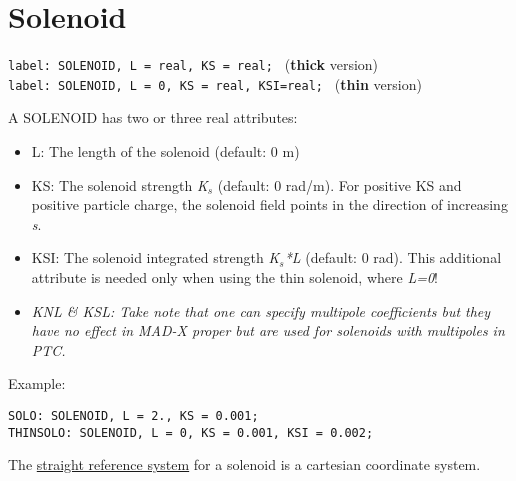 
\section{Solenoid}

\texttt{label: SOLENOID, L = real, KS = real;           } (\textbf{thick} version) 
\\
\texttt{label: SOLENOID, L = 0,    KS = real, KSI=real; } (\textbf{thin} version) 

A SOLENOID has two or three real attributes: 
\begin{itemize}
   \item L: The length of the solenoid (default: 0 m) 
   \item KS: The solenoid strength \textit{K$_s$} (default: 0
     rad/m). For positive KS and positive particle charge, the solenoid
     field points in the direction of increasing \textit{s}.  
   \item KSI: The solenoid integrated strength \textit{K$_s$*L}
     (default: 0 rad).  This additional attribute is needed only when
     using the thin solenoid,  where \textit{L=0}!     
   \item \textit{ KNL \& KSL:  Take note that one can specify multipole
     coefficients but they have no effect in MAD-X proper but are used
     for solenoids with multipoles in PTC.} 
\end{itemize}

Example: 
\begin{verbatim}
SOLO: SOLENOID, L = 2., KS = 0.001;
THINSOLO: SOLENOID, L = 0, KS = 0.001, KSI = 0.002;
\end{verbatim}

The \href{local_system.html#straight}{straight reference system} for a
solenoid is a cartesian coordinate system. 
 
